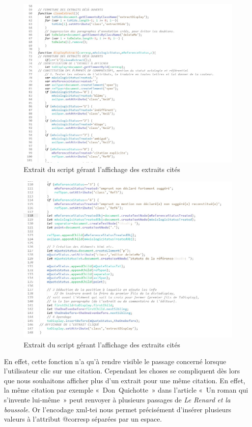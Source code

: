 \documentclass[12pt, a4paper]{article}
\begin{document}
\begin{figure}[H]
    \centering
    \includegraphics[scale =0.4]{img/screen_quote_js1.jpg}
    \caption{Extrait du script gérant l'affichage des extraits cités}
    \label{fig:displayExtract1}
\end{figure}
\begin{figure}[H]
    \centering
    \includegraphics[scale =0.4]{img/screen_quote_js2.jpg}
    \caption{Extrait du script gérant l'affichage des extraits cités}
    \label{fig:displayExtract2}
\end{figure}


En effet, cette fonction n'a qu'à rendre visible le passage concerné lorsque l'utilisateur clic sur une citation. Cependant les choses se compliquent dès lors que nous souhaitons afficher plus d'un extrait pour une même citation. En effet, la même citation par exemple «~Don~Quichotte~» dans l'article «~Un roman qui s'invente lui-même~» peut renvoyer à plusieurs passages de \textit{Le Renard et la boussole}. Or l'encodage xml-tei nous permet précisément d'insérer plusieurs valeurs à l'attribut @corresp séparées par un espace.
\end{document}
